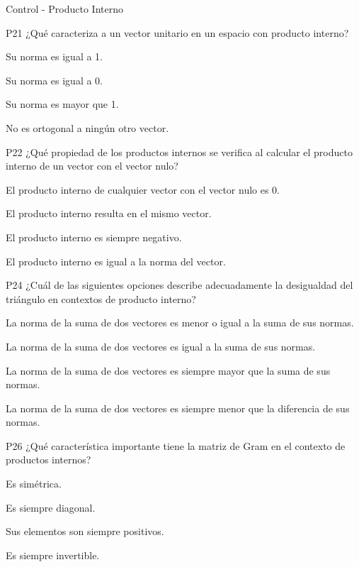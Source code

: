 \documentclass[a4,11pt]{aleph-notas}
\begin{document}
\begin{quiz}{Control - Producto Interno}
\begin{multi}[]%
    {P21}     
    ¿Qué caracteriza a un vector unitario en un espacio con producto interno?     
    \item* Su norma es igual a 1.     
    \item Su norma es igual a 0.     
    \item Su norma es mayor que 1.     
    \item No es ortogonal a ningún otro vector. 
\end{multi}

\begin{multi}[]%
    {P22}     
    ¿Qué propiedad de los productos internos se verifica al calcular el producto interno de un vector con el vector nulo?     
    \item* El producto interno de cualquier vector con el vector nulo es 0.     
    \item El producto interno resulta en el mismo vector.     
    \item El producto interno es siempre negativo.     
    \item El producto interno es igual a la norma del vector. 
\end{multi}

\begin{multi}[]%
    {P24}     
    ¿Cuál de las siguientes opciones describe adecuadamente la desigualdad del triángulo en contextos de producto interno?     
    \item* La norma de la suma de dos vectores es menor o igual a la suma de sus normas.     
    \item La norma de la suma de dos vectores es igual a la suma de sus normas.     
    \item La norma de la suma de dos vectores es siempre mayor que la suma de sus normas.     
    \item La norma de la suma de dos vectores es siempre menor que la diferencia de sus normas. 
\end{multi}

\begin{multi}[]%
    {P26}     
    ¿Qué característica importante tiene la matriz de Gram en el contexto de productos internos?     
    \item* Es simétrica.     
    \item Es siempre diagonal.     
    \item Sus elementos son siempre positivos.     
    \item Es siempre invertible. 
\end{multi}

\end{quiz}
\end{document}
